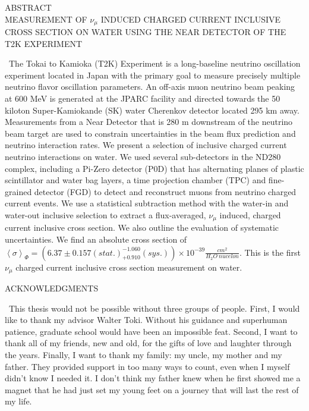 \setcounter{page}{2}
\begin{center}
ABSTRACT\\
\bigskip
MEASUREMENT OF $\nu_\mu$ INDUCED CHARGED CURRENT INCLUSIVE CROSS SECTION ON WATER USING THE NEAR DETECTOR OF THE T2K EXPERIMENT\\
\end{center}
\medskip
\-\ \indent The Tokai to Kamioka (T2K) Experiment is a long-baseline neutrino oscillation experiment located in Japan with the primary goal to measure precisely multiple neutrino flavor oscillation parameters. An off-axis muon neutrino beam peaking at 600 MeV is generated at the JPARC facility and directed towards the 50 kiloton Super-Kamiokande (SK) water Cherenkov detector located 295 km away. Measurements from a Near Detector that is 280 m downstream of the neutrino beam target are used to constrain uncertainties in the beam flux prediction and neutrino interaction rates. We present a selection of inclusive charged current neutrino interactions on water. We used several sub-detectors in the ND280 complex, including a Pi-Zero detector (P0D) that has alternating planes of plastic scintillator and water bag layers, a time projection chamber (TPC) and fine-grained detector (FGD) to detect and reconstruct muons from neutrino charged current events. We use a statistical subtraction method with the water-in and water-out inclusive selection to extract a flux-averaged, $\nu_\mu$ induced, charged current inclusive cross section. We also outline the evaluation of systematic uncertainties. We find an absolute cross section of $\left<\sigma\right>_\Phi = (6.37 \pm 0.157 (stat.) ^{-1.060}_{+0.910} (sys.))\times 10^{-39} \frac{cm^2}{H_2O\:nucelon}$. This is the first $\nu_\mu$ charged current inclusive cross section measurement on water. 

\newpage
\begin{center}
ACKNOWLEDGMENTS
\end{center}
\medskip
\-\ \indent This thesis would not be possible without three groups of people. First, I would like to thank my advisor Walter Toki. Without his guidance and superhuman patience, graduate school would have been an impossible feat. Second, I want to thank all of my friends, new and old, for the gifts of love and laughter through the years. Finally, I want to thank my family: my uncle, my mother and my father. They provided support in too many ways to count, even when I myself didn't know I needed it. I don't think my father knew when he first showed me a magnet that he had just set my young feet on a journey that will last the rest of my life.
\pagebreak




